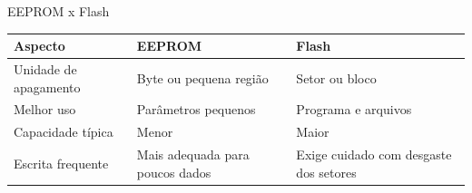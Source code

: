 \begin{frame}[t]{EEPROM x Flash}
  \small
  \setlength{\tabcolsep}{4pt}
  \begin{tabular}{>{\raggedright\arraybackslash}p{} p{} p{}}
    \toprule
    \textbf{Aspecto} & \textbf{EEPROM} & \textbf{Flash} \\
    \midrule
    Unidade de apagamento & Byte ou pequena região & Setor ou bloco \\
    Melhor uso & Parâmetros pequenos & Programa e arquivos \\
    Capacidade típica & Menor & Maior \\
    Escrita frequente & Mais adequada para poucos dados & Exige cuidado com desgaste dos setores \\
    \bottomrule
  \end{tabular}
\end{frame}
